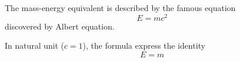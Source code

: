 \documentclass[12pt, letterpaper]{article}
\begin{document}
The mass-energy equivalent is described by the famous equation \[ E=mc^2 \] discovered by
Albert equation.

In natural unit ($c = 1$), the formula express the identity
\begin{equation}
E=m
\end{equation}
\end{document}
